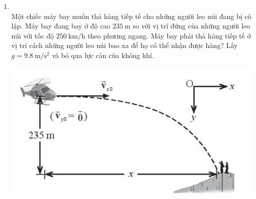 \begin{enumerate}[label=\bfseries Bài \arabic*:,leftmargin=1.5cm]
	
\item {}\\
Một chiếc máy bay muốn thả hàng tiếp tế cho những người leo núi đang bị cô lập. Máy bay đang bay ở độ cao $\SI{235}{\meter}$ so với vị trí đứng của những người leo núi với tốc độ $\SI{250}{\kilo\meter/\hour}$ theo phương ngang. Máy bay phải thả hàng tiếp tế ở vị trí cách những người leo núi bao xa để họ có thể nhận được hàng? Lấy $g=\SI{9.8}{\meter/\second^2}$ và bỏ qua lực cản của không khí.
\begin{center}
	\includegraphics[width=0.5\linewidth]{../figs/VN10-2022-PH-TP012-P-2}
\end{center}
\end{enumerate}